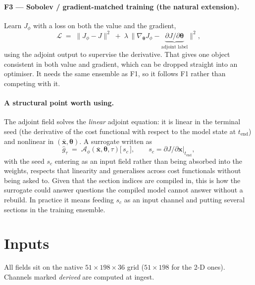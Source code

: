 \paragraph{F3 --- Sobolev / gradient-matched training (the natural extension).}
Learn $J_\phi$ with a loss on both the value and the gradient,
\begin{equation}
\mathcal{L} \;=\;
\big\|J_\phi - J\big\|^{2}
\;+\;
\lambda\,\Big\|\nabla_{\boldsymbol{\theta}} J_\phi
- \underbrace{\partial J/\partial\boldsymbol{\theta}}_{\text{adjoint label}}\Big\|^{2},
\end{equation}
using the adjoint output to supervise the derivative. That gives one object
consistent in both value and gradient, which can be dropped straight into an
optimiser. It needs the same ensemble as F1, so it follows F1 rather than
competing with it.

\paragraph{A structural point worth using.}
The adjoint field solves the \emph{linear} adjoint equation: it is linear in
the terminal seed (the derivative of the cost functional with respect to the
model state at $t_{\text{end}}$) and nonlinear in
$(\bar{\mathbf{x}},\boldsymbol{\theta})$. A surrogate written as
\begin{equation}
\hat{g}_\tau \;=\; \mathcal{A}_\phi\!\left(\bar{\mathbf{x}},
\boldsymbol{\theta},\tau\right)\big[\,s_c\,\big],
\qquad s_c=\partial J/\partial\mathbf{x}\big|_{t_{\text{end}}},
\end{equation}
with the seed $s_c$ entering as an input field rather than being absorbed into
the weights, respects that linearity and generalises across cost functionals
without being asked to. Given that the section indices are compiled in, this is
how the surrogate could answer questions the compiled model cannot answer
without a rebuild. In practice it means feeding $s_c$ as an input channel and
putting several sections in the training ensemble.

\section{Inputs}
\label{sec:inputs}

All fields sit on the native $51\times198\times36$ grid ($51\times198$ for the
2-D ones). Channels marked \emph{derived} are computed at ingest.

